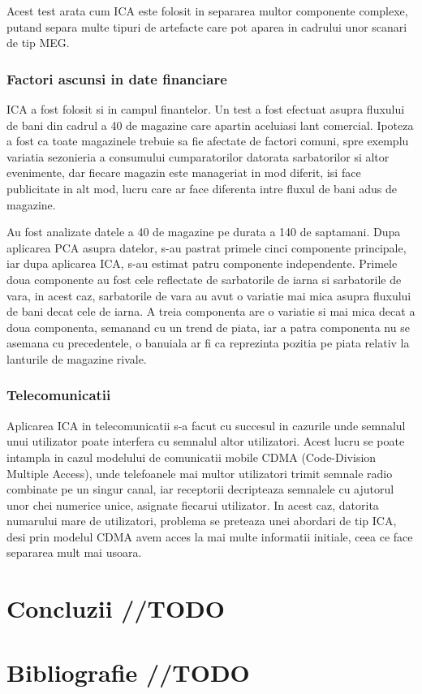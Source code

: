 \documentclass[12pt]{article}
\begin{document}
 Acest test arata cum ICA este folosit in separarea multor componente complexe, putand separa multe tipuri de artefacte care pot aparea in cadrului unor scanari de tip MEG.

 \subsubsection{Factori ascunsi in date financiare}
 ICA a fost folosit si in campul finantelor. Un test a fost efectuat asupra fluxului de bani din cadrul a 40 de magazine care apartin aceluiasi lant comercial. Ipoteza a fost ca toate magazinele trebuie sa fie afectate de factori comuni, spre exemplu variatia sezonieria a consumului cumparatorilor datorata sarbatorilor si altor evenimente, dar fiecare magazin este manageriat in mod diferit, isi face publicitate in alt mod, lucru care ar face diferenta intre fluxul de bani adus de magazine. 

 Au fost analizate datele a 40 de magazine pe durata a 140 de saptamani. Dupa aplicarea PCA asupra datelor, s-au pastrat primele cinci componente principale, iar dupa aplicarea ICA, s-au estimat patru componente independente. Primele doua componente au fost cele reflectate de sarbatorile de iarna si sarbatorile de vara, in acest caz, sarbatorile de vara au avut o variatie mai mica asupra fluxului de bani decat cele de iarna. A treia componenta are o variatie si mai mica decat a doua componenta, semanand cu un trend de piata, iar a patra componenta nu se asemana cu precedentele, o banuiala ar fi ca reprezinta pozitia pe piata relativ la lanturile de magazine rivale.

 \subsubsection{Telecomunicatii}
Aplicarea ICA in telecomunicatii s-a facut cu succesul in cazurile unde semnalul unui utilizator poate interfera cu semnalul altor utilizatori. Acest lucru se poate intampla in cazul modelului de comunicatii mobile CDMA (Code-Division Multiple Access), unde telefoanele mai multor utilizatori trimit semnale radio combinate pe un singur canal, iar receptorii decripteaza semnalele cu ajutorul unor chei numerice unice, asignate fiecarui utilizator. In acest caz, datorita numarului mare de utilizatori, problema se preteaza unei abordari de tip ICA, desi prin modelul CDMA avem acces la mai multe informatii initiale, ceea ce face separarea mult mai usoara.
\newpage
\section{Concluzii //TODO}
\section{Bibliografie //TODO}



\newpage
\cite{hyvarien}
\newpage
\end{document}
